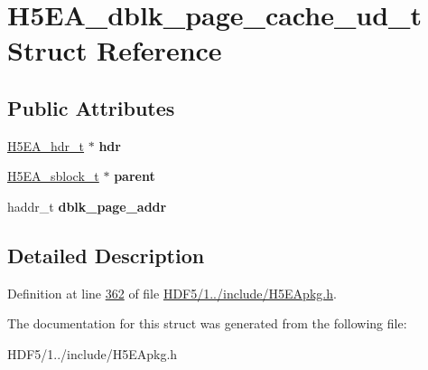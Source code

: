 \hypertarget{struct_h5_e_a__dblk__page__cache__ud__t}{}\section{H5\+E\+A\+\_\+dblk\+\_\+page\+\_\+cache\+\_\+ud\+\_\+t Struct Reference}
\label{struct_h5_e_a__dblk__page__cache__ud__t}
\subsection*{Public Attributes}
\begin{DoxyCompactItemize}
\item 
\mbox{\label{struct_h5_e_a__dblk__page__cache__ud__t_a8da62549701ad2c1752026d65ffbe13c}} 
\hyperlink{struct_h5_e_a__hdr__t}{H5\+E\+A\+\_\+hdr\+\_\+t} $\ast$ {\bfseries hdr}
\item 
\mbox{\label{struct_h5_e_a__dblk__page__cache__ud__t_a4827c1b406bf55f7cf85c29551b5064e}} 
\hyperlink{struct_h5_e_a__sblock__t}{H5\+E\+A\+\_\+sblock\+\_\+t} $\ast$ {\bfseries parent}
\item 
\mbox{\label{struct_h5_e_a__dblk__page__cache__ud__t_acae6a4dab522c0ffd5851131fff44a86}} 
haddr\+\_\+t {\bfseries dblk\+\_\+page\+\_\+addr}
\end{DoxyCompactItemize}


\subsection{Detailed Description}


Definition at line \hyperlink{_h_d_f5_21_810_81_2include_2_h5_e_apkg_8h_source_l00362}{362} of file \hyperlink{_h_d_f5_21_810_81_2include_2_h5_e_apkg_8h_source}{H\+D\+F5/1../include/\+H5\+E\+Apkg.\+h}.



The documentation for this struct was generated from the following file\+:\begin{DoxyCompactItemize}
\item 
H\+D\+F5/1../include/\+H5\+E\+Apkg.\+h\end{DoxyCompactItemize}
